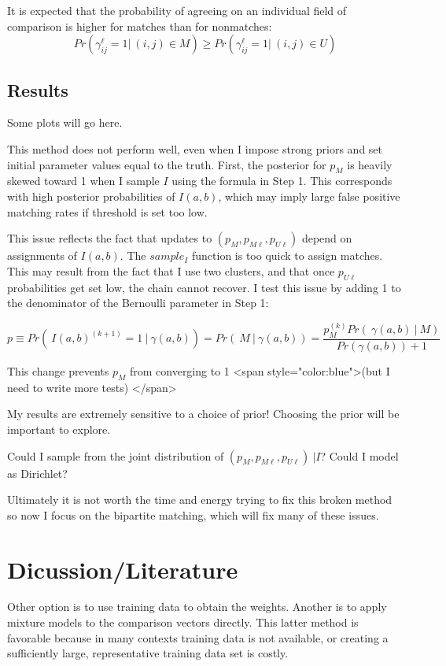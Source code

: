 \documentclass[11pt,reqno]{amsart}
\begin{document}
It is expected that the probability of agreeing on an individual field of comparison is higher for matches than for nonmatches:
$$Pr\left(\gamma_{ij}^{\ell} = 1 |\ (i,j)\in M\right) \geq Pr\left(\gamma_{ij}^{\ell} = 1 |\ (i,j) \in U\right) $$ 
\subsection{Results} Some plots will go here. 



This method does not perform well, even when I impose strong priors and set initial parameter values equal to the truth.   First, the posterior for $p_M$ is heavily skewed toward 1 when I sample $I$ using the formula in Step 1.  This corresponds with high posterior probabilities of $I(a,b)$, which may imply large false positive matching rates if threshold is set too low. 

This issue reflects the fact that updates to $(p_M, p_{M\ell}, p_{U\ell})$ depend on assignments of $I(a,b)$. The $sample_I$ function is too quick to assign matches.  This may result from the fact that I use two clusters, and that once $p_{U\ell}$ probabilities get set low, the chain cannot recover.  I test this issue by adding 1 to the denominator of the Bernoulli parameter in Step 1:

$$p \equiv Pr(\ I(a,b)^{(k+1)}=1\ |\ \gamma(a,b)) = Pr(\ M\  |\  \gamma(a,b)) = \frac{p_M^{(k)}Pr(\ \gamma(a,b)\ |\ M)}{Pr(\gamma(a,b)) + 1} $$ 

This change prevents $p_M$ from converging to 1 <span style="color:blue">(but I need to write more tests) </span>

My results are extremely sensitive to a choice of prior! Choosing the prior will be important to explore. 

Could I sample from the joint distribution of $(p_M, p_{M\ell}, p_{U\ell})\ | I$?  Could I model as Dirichlet?

Ultimately it is not worth the time and energy trying to fix this broken method so now I focus on the bipartite matching, which will fix many of these issues.


\section{Dicussion/Literature}

Other option is to use training data to obtain the weights.  Another is to apply mixture models to the comparison vectors directly.  This latter method is favorable because in many contexts training data is not available, or creating a sufficiently large, representative training data set is costly.  
\end{document}
